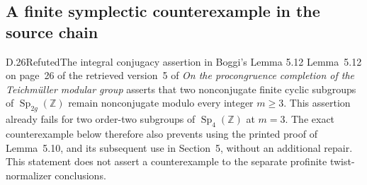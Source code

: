 \subsection{A finite symplectic counterexample in the source chain}

\begin{result}{D.26}{Refuted}{The integral conjugacy assertion in Boggi's Lemma 5.12}
Lemma~5.12 on page~26 of the retrieved version~5 of
\emph{On the procongruence completion of the Teichm\"uller modular group}
asserts that two nonconjugate finite cyclic subgroups of
$\operatorname{Sp}_{2g}(\mathbb Z)$ remain nonconjugate modulo
every integer $m\geq3$.  This assertion already fails for
two order-two subgroups of $\operatorname{Sp}_4(\mathbb Z)$
at $m=3$.  The exact counterexample below therefore also
prevents using the printed proof of Lemma~5.10, and its
subsequent use in Section~5, without an additional repair.
This statement does not assert a counterexample to the
separate profinite twist-normalizer conclusions.
\end{result}
